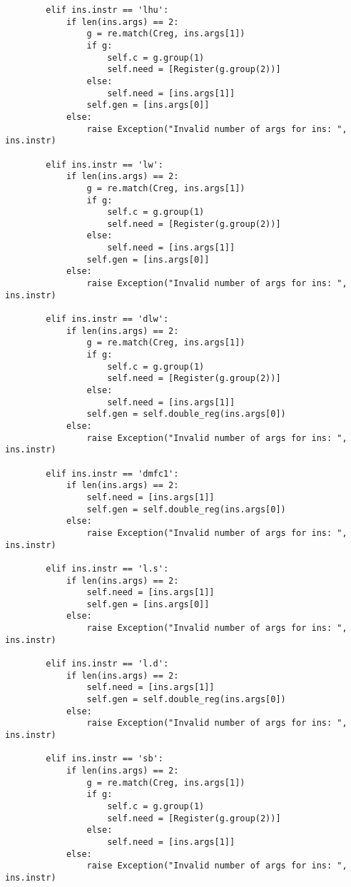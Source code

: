 \begin{lstlisting}
        elif ins.instr == 'lhu':
            if len(ins.args) == 2:
                g = re.match(Creg, ins.args[1])
                if g:
                    self.c = g.group(1)
                    self.need = [Register(g.group(2))]
                else:
                    self.need = [ins.args[1]] 
                self.gen = [ins.args[0]]
            else:
                raise Exception("Invalid number of args for ins: ", ins.instr)
                
        elif ins.instr == 'lw':
            if len(ins.args) == 2:
                g = re.match(Creg, ins.args[1])
                if g:
                    self.c = g.group(1)
                    self.need = [Register(g.group(2))]
                else:
                    self.need = [ins.args[1]] 
                self.gen = [ins.args[0]]
            else:
                raise Exception("Invalid number of args for ins: ", ins.instr)
                 
        elif ins.instr == 'dlw':
            if len(ins.args) == 2:
                g = re.match(Creg, ins.args[1])
                if g:
                    self.c = g.group(1)
                    self.need = [Register(g.group(2))]
                else:
                    self.need = [ins.args[1]]
                self.gen = self.double_reg(ins.args[0])
            else:
                raise Exception("Invalid number of args for ins: ", ins.instr)
                 
        elif ins.instr == 'dmfc1':
            if len(ins.args) == 2:
                self.need = [ins.args[1]] 
                self.gen = self.double_reg(ins.args[0])
            else:
                raise Exception("Invalid number of args for ins: ", ins.instr)
                
        elif ins.instr == 'l.s':
            if len(ins.args) == 2:
                self.need = [ins.args[1]]
                self.gen = [ins.args[0]]
            else:
                raise Exception("Invalid number of args for ins: ", ins.instr)
                
        elif ins.instr == 'l.d':
            if len(ins.args) == 2:
                self.need = [ins.args[1]]
                self.gen = self.double_reg(ins.args[0])
            else:
                raise Exception("Invalid number of args for ins: ", ins.instr)
                
        elif ins.instr == 'sb':   
            if len(ins.args) == 2:
                g = re.match(Creg, ins.args[1])
                if g:
                    self.c = g.group(1)
                    self.need = [Register(g.group(2))]
                else:
                    self.need = [ins.args[1]]
            else:
                raise Exception("Invalid number of args for ins: ", ins.instr)
                  

\end{lstlisting}
